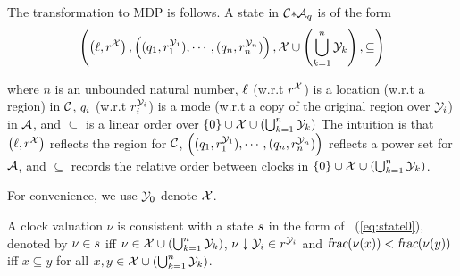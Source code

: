 \newcommand{\clocksN}{
    \clocksX \cup \left(
        \bigcup_{k=1}^{n} \clocksY_k
    \right )
}

The transformation to MDP is follows. A state in ${\mathcal{C}}{\ast}{\mathcal{A}_q}$ 
is of the form 
\begin{equation}\label{eq:state0}
    \left (
        \left (
            \ell,r^{\mathcal{X}}
        \right )
        ,
        \left (
            (q_1,r_1^{\mathcal{Y}_1}),
            \cdots,
            (q_n,r_n^{\mathcal{Y}_n})
        \right )
        ,
        \mathcal{X} \cup \left(
            \bigcup_{k=1}^{n} \mathcal{Y}_k
        \right )
        ,
        \subseteq
    \right )
\end{equation}

where $n$ is an unbounded natural number, $\ell$ (w.r.t $r^{\mathcal{X}}$) is a location (w.r.t a region) in $\mathcal{C}$, $q_i$ (w.r.t $r_i^{\mathcal{Y}_i}$) is a mode (w.r.t a copy of the original region over $\mathcal{Y}_i$) in $\mathcal{A}$, and $\subseteq$ is a linear order over 
$
    \{ 0 \} 
    \cup 
    \mathcal{X} 
    \cup \left(
        \bigcup_{k=1}^{n} \mathcal{Y}_k
    \right ) 
$
The intuition is that 
$
\left (
    \ell,r^{\mathcal{X}}
\right )
$ 
reflects the region for $\mathcal{C}$,
$ 
\left (
    (q_1,r_1^{\mathcal{Y}_1}),
    \cdots,
    (q_n,r_n^{\mathcal{Y}_n})
\right )
$
reflects a power set for $\mathcal{A}$, and $ \subseteq $ records the relative order between 
clocks in 
$
    \{ 0 \} 
    \cup 
    \mathcal{X} 
    \cup \left(
        \bigcup_{k=1}^{n} \mathcal{Y}_k
    \right ) 
$.

For convenience, we use $ \mathcal{Y}_0 $ denote $ \mathcal{X} $.

\begin{definition}[Consistency]
A clock valuation $\nu$ is consistent with a state $s$ in the form of ~(\ref{eq:state0}), 
denoted by $ \nu \in  s$
iff $\nu \in \clocksN$, $ \nu \downarrow \mathcal{Y}_i \in r^{\mathcal{Y}_i} $ and 
$\mbox{\sl frac}(\nu(x)) < \mbox{\sl frac}(\nu(y))$ iff $x \subseteq y$ for all $x,y \in \clocksN$.
\end{definition}

